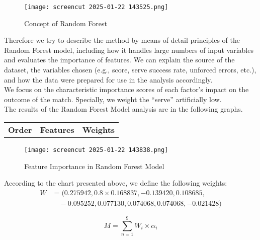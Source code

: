\documentclass{mcmthesis}
\begin{document}
\begin{figure}[htbp]
    \centering
    \texttt{[image: screencut 2025-01-22 143525.png]}
    \caption{Concept of Random Forest} \label{Figure 3}
\end{figure}

Therefore we try to describe the method by means of detail principles of the Random Forest
model, including how it handles large numbers of input variables and evaluates the importance of
features. We can explain the source of the dataset, the variables chosen (e.g., score, serve success
rate, unforced errors, etc.), and how the data were prepared for use in the analysis accordingly.\\
We focus on the characteristic importance scores of each factor's impact on the outcome of
the match. Specially, we weight the “serve” artificially low.\\
The results of the Random Forest Model analysis are in the following graphs.

\begin{center}
    \begin{tabular}{clc}
        {\bf Order}&{\bf Features}&{\bf Weights}\\[0.25cm]
       
        






    \end{tabular}
\end{center}

\begin{figure}[htbp]
    \centering
    \texttt{[image: screencut 2025-01-22 143838.png]}
    \caption{Feature Importance in Random Forest Model} \label{Figure 4}
\end{figure}

According to the chart presented above, we define the following weights:
\begin{equation} \label{(1)}
    \begin{split}
      W &= (0.275942, 0.8 \times 0.168837, -0.139420, 0.108685, \\
      &\quad -0.095252, 0.077130, 0.074068, 0.074068, -0.021428)
    \end{split}
\end{equation}
    

\begin{equation} \label{(2)}
    M= \sum_{n=1}^{9} W_{i}\times \alpha_{i}  
\end{equation}
\end{document}
